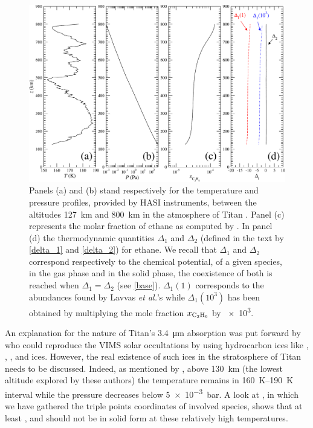 \documentclass{arxiv-icarus}
\begin{document}
\begin{figure}[!ht]
    \includegraphics[width=.75\textwidth]{Fig_2}
    \caption{Panels (a) and (b) stand respectively for the temperature and pressure profiles, provided by HASI instruments, between
    the altitudes \SI{127}{km} and \SI{800}{km} in the atmosphere of Titan \citep{Fulchignoni2005}.
    Panel (c) represents the molar fraction of ethane as computed by \cite{Lavvas2008b,Lavvas2008c}.
    In panel (d) the thermodynamic quantities $\Delta_1$ and $\Delta_2$ (defined in the text by \eqref{delta_1} and
    \eqref{delta_2}) for ethane.
    We recall that $\Delta_1$ and $\Delta_2$ correspond respectively to the chemical potential, of a given species, in the gas phase and in the solid phase, the coexistence of both is reached when $\Delta_1 = \Delta_2$ (see \eqref{base}).
    $\Delta_{1}(1)$ corresponds to the abundances found by Lavvas \textit{et al.}'s while
    $\Delta_{1}(10^3)$ has been obtained by multiplying the mole fraction $x_\text{\ce{C2H6}}$ by \num{e3}.}
    \label{fig:thermoC2H6}
\end{figure}


An explanation for the nature of Titan's \SI{3.4}{\um} absorption was put forward by \cite{Kim2011} who could reproduce the VIMS solar occultations by using hydrocarbon ices like , , ,  and  ices.
However, the real existence of such ices in the stratosphere of Titan needs to be discussed. Indeed, as mentioned by \cite{Kim2011}, above \SI{130}{km} (the lowest altitude explored by these authors) the temperature remains in \SIrange{160}{190}{K} interval while the pressure decreases below \SI{5e-3}{bar}. A look at , in which we have gathered the triple points coordinates of involved species, shows that at least ,  and  should not be in solid form at these relatively high temperatures.
\end{document}
